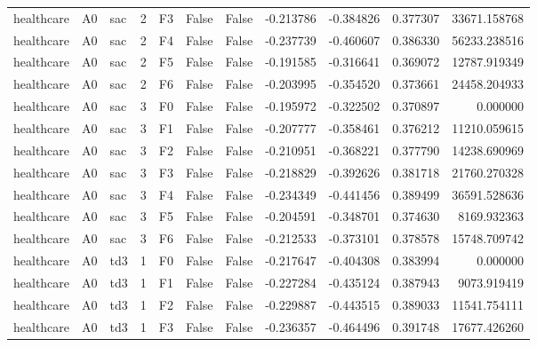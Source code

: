 \begin{tabular}{lllrlllrrrr}
healthcare &      A0 &       sac &     2 &  F3 &           False &            False & -0.213786 & -0.384826 & 0.377307 &     33671.158768 \\
healthcare &      A0 &       sac &     2 &  F4 &           False &            False & -0.237739 & -0.460607 & 0.386330 &     56233.238516 \\
healthcare &      A0 &       sac &     2 &  F5 &           False &            False & -0.191585 & -0.316641 & 0.369072 &     12787.919349 \\
healthcare &      A0 &       sac &     2 &  F6 &           False &            False & -0.203995 & -0.354520 & 0.373661 &     24458.204933 \\
healthcare &      A0 &       sac &     3 &  F0 &           False &            False & -0.195972 & -0.322502 & 0.370897 &         0.000000 \\
healthcare &      A0 &       sac &     3 &  F1 &           False &            False & -0.207777 & -0.358461 & 0.376212 &     11210.059615 \\
healthcare &      A0 &       sac &     3 &  F2 &           False &            False & -0.210951 & -0.368221 & 0.377790 &     14238.690969 \\
healthcare &      A0 &       sac &     3 &  F3 &           False &            False & -0.218829 & -0.392626 & 0.381718 &     21760.270328 \\
healthcare &      A0 &       sac &     3 &  F4 &           False &            False & -0.234349 & -0.441456 & 0.389499 &     36591.528636 \\
healthcare &      A0 &       sac &     3 &  F5 &           False &            False & -0.204591 & -0.348701 & 0.374630 &      8169.932363 \\
healthcare &      A0 &       sac &     3 &  F6 &           False &            False & -0.212533 & -0.373101 & 0.378578 &     15748.709742 \\
healthcare &      A0 &       td3 &     1 &  F0 &           False &            False & -0.217647 & -0.404308 & 0.383994 &         0.000000 \\
healthcare &      A0 &       td3 &     1 &  F1 &           False &            False & -0.227284 & -0.435124 & 0.387943 &      9073.919419 \\
healthcare &      A0 &       td3 &     1 &  F2 &           False &            False & -0.229887 & -0.443515 & 0.389033 &     11541.754111 \\
healthcare &      A0 &       td3 &     1 &  F3 &           False &            False & -0.236357 & -0.464496 & 0.391748 &     17677.426260 \\

\end{tabular}
